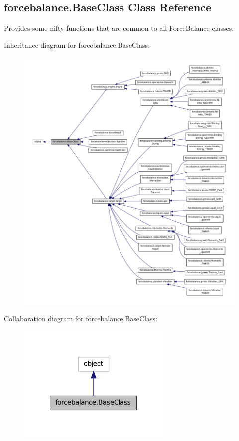 \hypertarget{classforcebalance_1_1BaseClass}{\subsection{forcebalance.\-Base\-Class Class Reference}
\label{classforcebalance_1_1BaseClass}
}


Provides some nifty functions that are common to all Force\-Balance classes.  




Inheritance diagram for forcebalance.\-Base\-Class\-:
\nopagebreak
\begin{figure}[H]
\begin{center}
\leavevmode
\includegraphics[width=350pt]{classforcebalance_1_1BaseClass__inherit__graph}
\end{center}
\end{figure}


Collaboration diagram for forcebalance.\-Base\-Class\-:
\nopagebreak
\begin{figure}[H]
\begin{center}
\leavevmode
\includegraphics[width=210pt]{classforcebalance_1_1BaseClass__coll__graph}
\end{center}
\end{figure}
